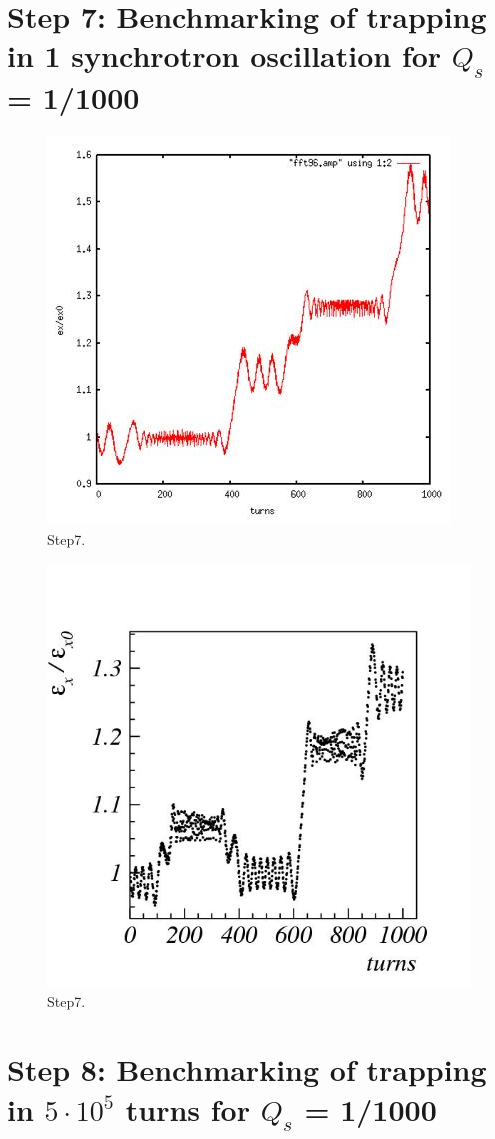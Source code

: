 \documentclass[a4paper]{cernatsnote}
\begin{document}
\section{Step 7: Benchmarking of trapping in 1 synchrotron oscillation for $Q_s$ = 1/1000}

\begin{figure}[!htb]
        \centering
        \includegraphics[width=0.5\columnwidth]{Step7_trapping_MICROMAP.jpg}
        \caption{Step7.}
        \label{fig:step7_m}
\end{figure}

\begin{figure}[!htb]
        \centering
        \includegraphics[width=0.5\columnwidth]{Step7_trapping_SIMPSONS.jpg}
        \caption{Step7.}
        \label{fig:step7_s}
\end{figure}

\section{Step 8: Benchmarking of trapping in $5 \cdot 10^5$ turns for $Q_s$ = 1/1000}
\end{document}
